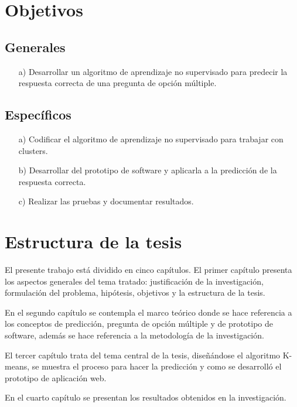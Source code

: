 \section{Objetivos}

\subsection{Generales}
\begin{enumerate}
\item[a)] Desarrollar un algoritmo de aprendizaje no supervisado para predecir la respuesta correcta de una pregunta de opción múltiple.
\end{enumerate}

\subsection{Específicos}
\begin{enumerate}
\item[a)] Codificar el algoritmo de aprendizaje no supervisado para trabajar con clusters.
\item[b)] Desarrollar del prototipo de software y aplicarla a la predicción de la respuesta correcta.
\item[c)] Realizar las pruebas y documentar resultados.
\end{enumerate}
\vskip 0.3cm


\section{Estructura de la tesis}

\vskip 0.1cm
El presente trabajo está dividido en cinco capítulos. El primer capítulo presenta los aspectos generales del tema tratado: justificación de la investigación, formulación del problema, hipótesis, objetivos y la estructura de la tesis.

En el segundo capítulo se contempla el marco teórico donde se hace referencia a los conceptos de predicción, pregunta de opción múltiple y de prototipo de software, además se hace referencia a la metodología de la investigación.

El tercer capítulo trata del tema central de la tesis, diseñándose el algoritmo K-means, se muestra el proceso para hacer la predicción y como se desarrolló el prototipo de aplicación web.

En el cuarto capítulo se presentan los resultados obtenidos en la investigación. 


